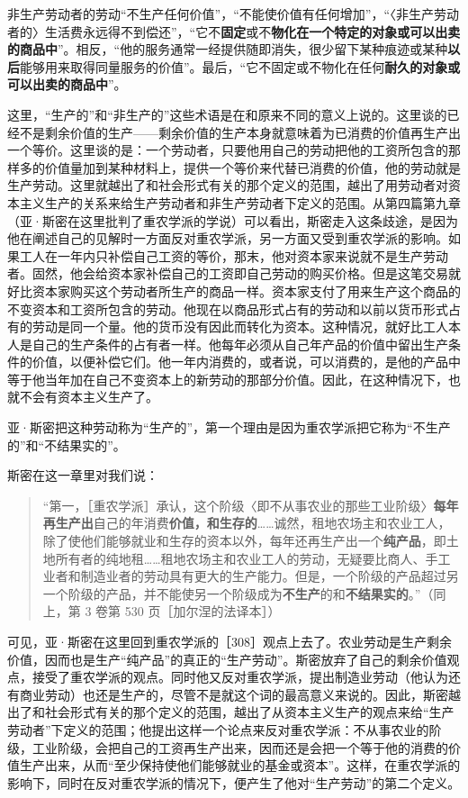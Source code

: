 非生产劳动者的劳动“不生产任何价值”，“不能使价值有任何增加”，“〈非生产劳动者的〉生活费永远得不到偿还”，“它不\textbf{固定}或不\textbf{物化在一个特定的对象或可以出卖的商品中}”。相反，“他的服务通常一经提供随即消失，很少留下某种痕迹或某种\textbf{以后}能够用来取得同量服务的价值”。最后，“它不固定或不物化在任何\textbf{耐久的对象或可以出卖的商品中}”。

这里，“生产的”和“非生产的”这些术语是在和原来不同的意义上说的。这里谈的已经不是剩余价值的生产——剩余价值的生产本身就意味着为已消费的价值再生产出一个等价。这里谈的是：一个劳动者，只要他用自己的劳动把他的工资所包含的那样多的价值量加到某种材料上，提供一个等价来代替已消费的价值，他的劳动就是生产劳动。这里就越出了和社会形式有关的那个定义的范围，越出了用劳动者对资本主义生产的关系来给生产劳动者和非生产劳动者下定义的范围。从第四篇第九章（亚·斯密在这里批判了重农学派的学说）可以看出，斯密走入这条歧途，是因为他在阐述自己的见解时一方面反对重农学派，另一方面又受到重农学派的影响。如果工人在一年内只补偿自己工资的等价，那末，他对资本家来说就不是生产劳动者。固然，他会给资本家补偿自己的工资即自己劳动的购买价格。但是这笔交易就好比资本家购买这个劳动者所生产的商品一样。资本家支付了用来生产这个商品的不变资本和工资所包含的劳动。他现在以商品形式占有的劳动和以前以货币形式占有的劳动是同一个量。他的货币没有因此而转化为资本。这种情况，就好比工人本人是自己的生产条件的占有者一样。他每年必须从自己年产品的价值中留出生产条件的价值，以便补偿它们。他一年内消费的，或者说，可以消费的，是他的产品中等于他当年加在自己不变资本上的新劳动的那部分价值。因此，在这种情况下，也就不会有资本主义生产了。

亚·斯密把这种劳动称为“生产的”，第一个理由是因为重农学派把它称为“不生产的”和“不结果实的”。

斯密在这一章里对我们说：

\begin{quote}“第一，［重农学派］承认，这个阶级〈即不从事农业的那些工业阶级〉\textbf{每年再生产出}自己的年消费\textbf{价值，和生存的}……诚然，租地农场主和农业工人，除了使他们能够就业和生存的资本以外，每年还再生产出一个\textbf{纯产品}，即土地所有者的纯地租……租地农场主和农业工人的劳动，无疑要比商人、手工业者和制造业者的劳动具有更大的生产能力。但是，一个阶级的产品超过另一个阶级的产品，并不能使另一个阶级成为\textbf{不生产}的和\textbf{不结果实的}。”（同上，第 3 卷第 530 页［加尔涅的法译本］）\end{quote}

可见，亚·斯密在这里回到重农学派的［308］观点上去了。农业劳动是生产剩余价值，因而也是生产“纯产品”的真正的“生产劳动”。斯密放弃了自己的剩余价值观点，接受了重农学派的观点。同时他又反对重农学派，提出制造业劳动（他认为还有商业劳动）也还是生产的，尽管不是就这个词的最高意义来说的。因此，斯密越出了和社会形式有关的那个定义的范围，越出了从资本主义生产的观点来给“生产劳动者”下定义的范围；他提出这样一个论点来反对重农学派：不从事农业的阶级，工业阶级，会把自己的工资再生产出来，因而还是会把一个等于他的消费的价值生产出来，从而“至少保持使他们能够就业的基金或资本”。这样，在重农学派的影响下，同时在反对重农学派的情况下，便产生了他对“生产劳动”的第二个定义。

